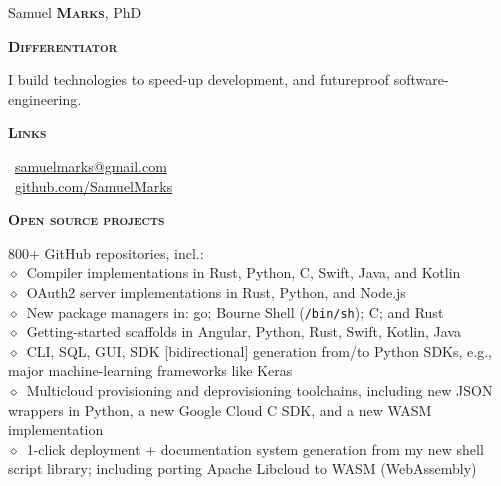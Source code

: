 \documentclass[11pt, a4paper]{article}
\newcommand{\smaller}[1]{{\small$\diamond$\ #1}}
\newcommand{\headleft}[1]{\vspace*{3ex}\textsc{\textbf{#1}}\par%
    \vspace*{-1.5ex}\hrulefill\par\vspace*{0.7ex}}
\begin{document}
\begin{minipage}[t]{0.33\textwidth} %
\colorbox{cvblue}{\begin{minipage}[t][5mm][t]{\textwidth}\null\hfill\null\end{minipage}}

\vspace{-.2ex} %
\colorbox{cvblue!90}{\color{white}  %
\textwidth\relax%
\begin{minipage}[t][293mm][t]{0.82\textwidth}
\raggedright
\vspace*{2.5ex}

\Large Samuel \textbf{\textsc{Marks}}, PhD \normalsize


\vspace*{0.5ex} %

\headleft{Differentiator}
I build technologies to speed-up development, and futureproof software-engineering.

\headleft{Links}
\small %
\MVAt\ \href{mailto://samuelmarks@gmail.com}{\small samuelmarks@gmail.com} \\[0.4ex]
\Mundus\ \href{https://github.com/SamuelMarks}{github.com/SamuelMarks} \\[0.1ex]
\normalsize

\headleft{Open source projects}
800+ GitHub repositories, incl.:\\
\smaller{Compiler implementations in Rust, Python, C, Swift, Java, and Kotlin}\\
\smaller{OAuth2 server implementations in Rust, Python, and Node.js}\\
\smaller{New package managers in: go; Bourne Shell (\texttt{/bin/sh}); C; and Rust}\\
\smaller{Getting-started scaffolds in Angular, Python, Rust, Swift, Kotlin, Java}\\
\smaller{\textbraceleft{}CLI, SQL, GUI, SDK\textbraceright{} [bidirectional] generation from/to Python SDKs, e.g., major machine-learning frameworks like Keras}\\
\smaller{Multicloud provisioning and deprovisioning toolchains, including new JSON wrappers in Python, a new Google Cloud C SDK, and a new WASM implementation}\\
\smaller{1-click deployment + documentation system generation from my new shell script library; including porting Apache Libcloud to WASM (WebAssembly)}

\end{minipage}%
\textwidth\relax%
}
\end{minipage}%
\end{document}
